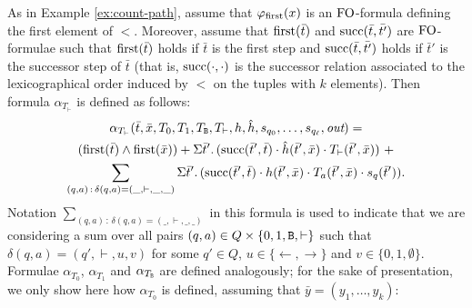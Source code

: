 As in Example \ref{ex:count-path}, assume that $\varphi_{\text{\rm first}}(x)$ is an ${\rm FO}$-formula defining the first element of $<$. Moreover, assume that $\operatorname{first}(\bar t)$ and $\operatorname{succ}(\bar{t},\bar{t'})$ are ${\rm FO}$-formulae such that 
$\operatorname{first}(\bar t)$ holds if $\bar t$ is the first step and $\operatorname{succ}(\bar{t},\bar{t'})$ holds if $\bar t'$ is the successor step of $\bar t$ (that is, $\operatorname{succ}(\cdot,\cdot)$ is the successor relation associated to the lexicographical order induced by $<$ on the tuples with $k$ elements).  Then formula $\alpha_{T_{\vdash}}$ is defined as follows:
\begin{multline*}
\alpha_{T_{\vdash}}(\bar{t},\bar{x},T_0,T_1,T_{\mathtt{B}},T_{\vdash},h,\hat{h},s_{q_0},\ldots,s_{q_{\ell}},\text{\it out}) = \\
(\operatorname{first}(\bar{t}) \wedge \operatorname{first}(\bar{x})) +
\Sigma{\bar{t}'}.\,(\text{succ}(\bar{t}',\bar{t}) \cdot \hat{h}(\bar{t}',\bar{x}) \cdot T_{\vdash}(\bar{t}',\bar{x})) \ + \\
\sum_{(q,a) \,:\, \delta(q,a) = (\_,\vdash,\_,\_)}\Sigma{\bar{t}'}.\,(\text{succ}(\bar{t}',\bar{t}) \cdot h(\bar{t}',\bar{x}) \cdot T_a(\bar{t}',\bar{x}) \cdot s_{q}(\bar{t}')).
\end{multline*}
Notation $\sum_{(q,a) \,:\, \delta(q,a) = (\_,\vdash,\_,\_)}$ in this formula is used to indicate that we are considering a sum over all pairs $(q,a) \in Q \times \{0,1,\mathtt{B},\vdash\}$ such that $\delta(q,a) = (q',\vdash,u,v)$ for some $q' \in Q$, $u \in \{\leftarrow,\rightarrow\}$ and $v \in \{0,1,\emptyset\}$.
Formulae $\alpha_{T_0}$, $\alpha_{T_1}$ and $\alpha_{T_{\mathtt{B}}}$ are defined analogously; for the sake of presentation, we only show here how $\alpha_{T_0}$ is defined, assuming that $\bar y = (y_1, \ldots, y_k)$:
